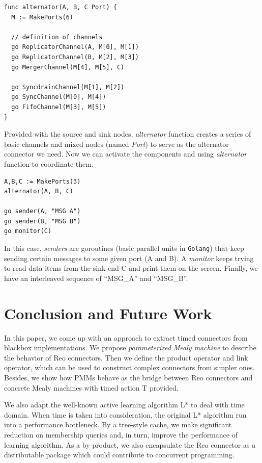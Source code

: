 \documentclass[conference, a4paper]{IEEEtran}
\begin{document}
\begin{lstlisting}
func alternator(A, B, C Port) {
  M := MakePorts(6)

  // definition of channels
  go ReplicatorChannel(A, M[0], M[1])
  go ReplicatorChannel(B, M[2], M[3])
  go MergerChannel(M[4], M[5], C)

  go SyncdrainChannel(M[1], M[2])
  go SyncChannel(M[0], M[4])
  go FifoChannel(M[3], M[5])
}
\end{lstlisting}

Provided with the source and sink nodes, \emph{alternator} function creates a series of basic
channels and mixed nodes (named \emph{Port}) to serve as the alternator connector we need. Now we
can activate the components and using \emph{alternator} function to coordinate them.

\begin{lstlisting}
A,B,C := MakePorts(3)
alternator(A, B, C)

go sender(A, "MSG A")
go sender(B, "MSG B")
go monitor(C)
\end{lstlisting}

In this case, \emph{senders} are goroutines (basic parallel units in \texttt{Golang}) that keep
sending certain messages to some given port (A and B). A \emph{monitor} keeps trying to read data
items from the sink end C and print them on the screen. Finally, we have an interleaved sequence of
``MSG\_A'' and ``MSG\_B''.
 
\section{Conclusion and Future Work}
In this paper, we come up with an approach to extract timed connectors from blackbox
implementations. We propose \emph{parameterized Mealy machine} to describe the behavior of Reo
connectors. Then we define the product operator and link operator, which can be used to
construct complex connectors from simpler ones.
Besides, we show how PMMs behave as the bridge between Reo connectors and concrete Mealy
machines with timed action T provided. 

We also adapt the well-known active learning algorithm L* to deal with time domain.
When time is taken into consideration, the original L* algorithm run into a performance bottleneck.
By a tree-style cache, we make significant reduction on membership queries and, in turn,
improve the performance of learning algorithm. As a by-product, we also encapsulate the Reo
connector as a distributable package which could contribute to concurrent programming.
\end{document}
